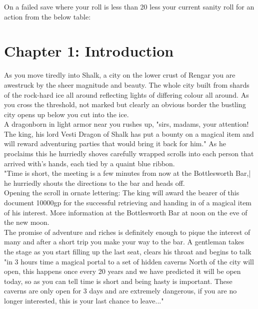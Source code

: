 \documentclass[10pt,twoside,twocolumn]{article}
\begin{document}
On a failed save where your roll is less than 20 less your current sanity roll for an action from the below table: \\

\begin{dndtable}
\end{dndtable}

\section{Chapter 1: Introduction}
\begin{quotebox}
As you move tiredly into Shalk, a city on the lower crust of Rengar you are awestruck by the sheer magnitude and beauty. The whole city built from shards of the rock-hard ice all around reflecting lights of differing colour all around. As you cross the threshold, not marked but clearly an obvious border the bustling city opens up below you cut into the ice. \\

A dragonborn in light armor near you rushes up, "sirs, madams, your attention! The king, his lord Vesti Dragon of Shalk has put a bounty on a magical item and will reward adventuring parties that would bring it back for him." As he proclaims this he hurriedly shoves carefully wrapped scrolls into each person that arrived with's hands, each tied by a quaint blue ribbon. \\

"Time is short, the meeting is a few minutes from now at the Bottlesworth Bar,| he hurriedly shouts the directions to the bar and heads off.\\

Opening the scroll in ornate lettering: The king will award the bearer of this document 10000gp for the successful retrieving and handing in of a magical item of his interest. More information at the Bottlesworth Bar at noon on the eve of the new moon. \\

The promise of adventure and riches is definitely enough to pique the interest of many and after a short trip you make your way to the bar. A gentleman takes the stage as you start filling up the last seat, clears his throat and begins to talk "in 3 hours time a magical portal to a set of hidden caverns North of the city will open, this happens once every 20 years and we have predicted it will be open today, so as you can tell time is short and being hasty is important. These caverns are only open for 3 days and are extremely dangerous, if you are no longer interested, this is your last chance to leave..." \\


\end{quotebox}
\end{document}
